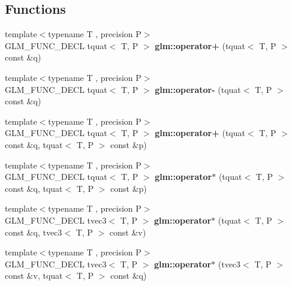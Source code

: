\subsection*{Functions}
\begin{DoxyCompactItemize}
\item 
\hypertarget{group__gtc__quaternion_ga6443d80d8429baec64193d0e31e580c8}{{\footnotesize template$<$typename T , precision P$>$ }\\G\-L\-M\-\_\-\-F\-U\-N\-C\-\_\-\-D\-E\-C\-L tquat$<$ T, P $>$ {\bfseries glm\-::operator+} (tquat$<$ T, P $>$ const \&q)}\label{group__gtc__quaternion_ga6443d80d8429baec64193d0e31e580c8}

\item 
\hypertarget{group__gtc__quaternion_ga76d2d3e18c09dbd336ba90b498fefbba}{{\footnotesize template$<$typename T , precision P$>$ }\\G\-L\-M\-\_\-\-F\-U\-N\-C\-\_\-\-D\-E\-C\-L tquat$<$ T, P $>$ {\bfseries glm\-::operator-\/} (tquat$<$ T, P $>$ const \&q)}\label{group__gtc__quaternion_ga76d2d3e18c09dbd336ba90b498fefbba}

\item 
\hypertarget{group__gtc__quaternion_ga517657374d8ca180d63c33ff9430518a}{{\footnotesize template$<$typename T , precision P$>$ }\\G\-L\-M\-\_\-\-F\-U\-N\-C\-\_\-\-D\-E\-C\-L tquat$<$ T, P $>$ {\bfseries glm\-::operator+} (tquat$<$ T, P $>$ const \&q, tquat$<$ T, P $>$ const \&p)}\label{group__gtc__quaternion_ga517657374d8ca180d63c33ff9430518a}

\item 
\hypertarget{group__gtc__quaternion_gabca7455f687e322b505531e15786d845}{{\footnotesize template$<$typename T , precision P$>$ }\\G\-L\-M\-\_\-\-F\-U\-N\-C\-\_\-\-D\-E\-C\-L tquat$<$ T, P $>$ {\bfseries glm\-::operator$\ast$} (tquat$<$ T, P $>$ const \&q, tquat$<$ T, P $>$ const \&p)}\label{group__gtc__quaternion_gabca7455f687e322b505531e15786d845}

\item 
\hypertarget{group__gtc__quaternion_ga5b0cccc7f163f2b7bbf3536deb403d9a}{{\footnotesize template$<$typename T , precision P$>$ }\\G\-L\-M\-\_\-\-F\-U\-N\-C\-\_\-\-D\-E\-C\-L tvec3$<$ T, P $>$ {\bfseries glm\-::operator$\ast$} (tquat$<$ T, P $>$ const \&q, tvec3$<$ T, P $>$ const \&v)}\label{group__gtc__quaternion_ga5b0cccc7f163f2b7bbf3536deb403d9a}

\item 
\hypertarget{group__gtc__quaternion_ga70dbac44fc9fb59659218ad4ed7870ed}{{\footnotesize template$<$typename T , precision P$>$ }\\G\-L\-M\-\_\-\-F\-U\-N\-C\-\_\-\-D\-E\-C\-L tvec3$<$ T, P $>$ {\bfseries glm\-::operator$\ast$} (tvec3$<$ T, P $>$ const \&v, tquat$<$ T, P $>$ const \&q)}\label{group__gtc__quaternion_ga70dbac44fc9fb59659218ad4ed7870ed}


\end{DoxyCompactItemize}
